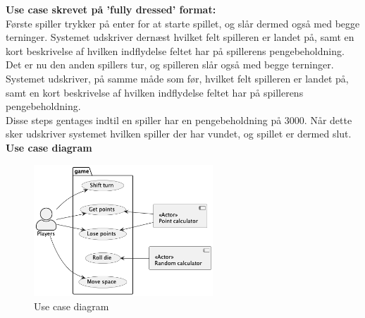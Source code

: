 \documentclass{article}
\begin{document}
\textbf{Use case skrevet på 'fully dressed' format:}\\
Første spiller trykker på enter for at starte spillet, og slår dermed også med begge terninger. Systemet udskriver dernæst hvilket felt spilleren er landet på, samt en kort beskrivelse af hvilken indflydelse feltet har på spillerens pengebeholdning.\\
Det er nu den anden spillers tur, og spilleren slår også med begge terninger. Systemet udskriver, på samme måde som før, hvilket felt spilleren er landet på, samt en kort beskrivelse af hvilken indflydelse feltet har på spillerens pengebeholdning.\\
Disse steps gentages indtil en spiller har en pengebeholdning på 3000. Når dette sker udskriver systemet hvilken spiller der har vundet, og spillet er dermed slut.\\
\textbf{Use case diagram}
\begin{figure} [h]
    \centering
    \includegraphics[width = 0.6\textwidth]{Billeder/UseCaseDiagram.png}
    \caption{Use case diagram}
\end{figure}
\end{document}
